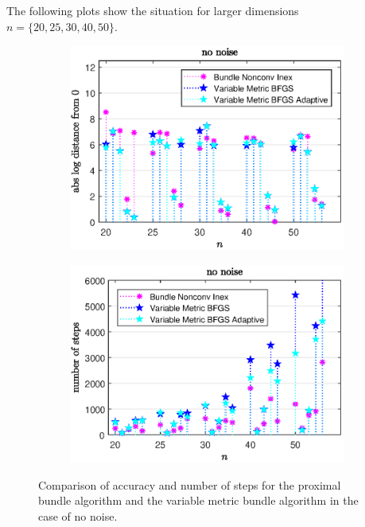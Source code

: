The following plots show the situation for larger dimensions \(n = \{20,25,30,40,50\}\).


\begin{figure}[H]%
	\begin{subfigure}{0.49\textwidth}
		\includegraphics[width=\textwidth]{Pictures/Plots/no_noise_b.eps}%
	\end{subfigure}%
	\hfill
	\begin{subfigure}{0.49\textwidth}
		\includegraphics[width=\textwidth]{Pictures/Plots/steps_no_noise_b.eps}%
	\end{subfigure}
	\caption[Accuracy and number of steps: no noise, higher dimensions]{Comparison of accuracy and number of steps for the proximal bundle algorithm and the variable metric bundle algorithm in the case of no noise.}
	\label{fig_no_noise_large}

\end{figure}

